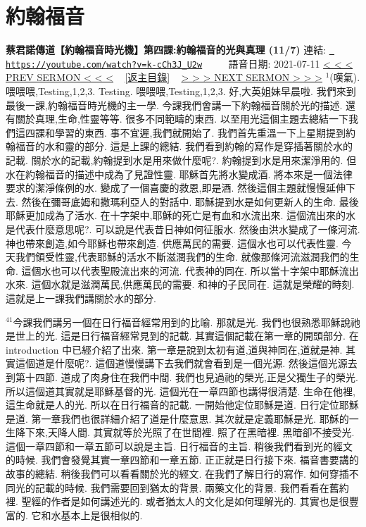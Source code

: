 \documentclass{book}
\begin{document}
\section{約翰福音}
\label{sec:k_cCh3J_U2w}
\textbf{蔡君諾傳道【約翰福音時光機】第四課:約翰福音的光與真理 (11/7)}
\newline
\newline
連結: \href{https://youtube.com/watch?v=k-cCh3J_U2w}{\texttt{ https://youtube.com/watch?v=k-cCh3J\_U2w}} ~~~~ 語音日期: 2021-07-11 
\newline
\newline
\hyperref[sec:dO8lwORzvRQ]{\small{< < < PREV SERMON < < <}}
~
\hyperref[sec:index]{\small{[返主目錄]}}
~
\hyperref[sec:MrgiW6jGDH4]{\small{> > > NEXT SERMON > > >}}
\newline
\newline
$^{1}$(嘆氣).
喂喂喂,Testing,1,2,3.
Testing.
喂喂喂,Testing,1,2,3.
好,大英姐妹早晨啦.
我們來到最後一課,約翰福音時光機的主一學.
今課我們會講一下約翰福音關於光的描述.
還有關於真理,生命,性靈等等.
很多不同範疇的東西.
以至用光這個主題去總結一下我們這四課和學習的東西.
事不宜遲,我們就開始了.
我們首先重溫一下上星期提到約翰福音的水和靈的部分.
這是上課的總結.
我們看到約翰的寫作是穿插著關於水的記載.
關於水的記載,約翰提到水是用來做什麼呢?.
約翰提到水是用來潔淨用的.
但水在約翰福音的描述中成為了見證性靈.
耶穌首先將水變成酒.
將本來是一個法律要求的潔淨條例的水.
變成了一個喜慶的救恩,即是酒.
然後這個主題就慢慢延伸下去.
然後在彌哥底姆和撒瑪利亞人的對話中.
耶穌提到水是如何更新人的生命.
最後耶穌更加成為了活水.
在十字架中,耶穌的死亡是有血和水流出來.
這個流出來的水是代表什麼意思呢?.
可以說是代表昔日神如何征服水.
然後由洪水變成了一條河流.
神也帶來創造,如今耶穌也帶來創造.
供應萬民的需要.
這個水也可以代表性靈.
今天我們領受性靈,代表耶穌的活水不斷滋潤我們的生命.
就像那條河流滋潤我們的生命.
這個水也可以代表聖殿流出來的河流.
代表神的同在.
所以當十字架中耶穌流出水來.
這個水就是滋潤萬民,供應萬民的需要.
和神的子民同在.
這就是榮耀的時刻.
這就是上一課我們講關於水的部分.

$^{41}$今課我們講另一個在日行福音經常用到的比喻.
那就是光.
我們也很熟悉耶穌說祂是世上的光.
這是日行福音經常見到的記載.
其實這個記載在第一章的開頭部分.
在introduction 中已經介紹了出來.
第一章是說到太初有道,道與神同在,道就是神.
其實這個道是什麼呢?.
這個道慢慢講下去我們就會看到是一個光源.
然後這個光源去到第十四節.
道成了肉身住在我們中間.
我們也見過祂的榮光,正是父獨生子的榮光.
所以這個道其實就是耶穌基督的光.
這個光在一章四節也講得很清楚.
生命在他裡,這生命就是人的光.
所以在日行福音的記載.
一開始他定位耶穌是道.
日行定位耶穌是道.
第一章我們也很詳細介紹了道是什麼意思.
其次就是定義耶穌是光.
耶穌的一生降下來,天降人間.
其實就等於光照了在世間裡.
照了在黑暗裡.
黑暗卻不接受光.
這個一章四節和一章五節可以說是主旨.
日行福音的主旨.
稍後我們看到光的經文的時候.
我們會發覺其實一章四節和一章五節.
正正就是日行接下來.
福音書要講的故事的總結.
稍後我們可以看看關於光的經文.
在我們了解日行的寫作.
如何穿插不同光的記載的時候.
我們需要回到猶太的背景.
兩藥文化的背景.
我們看看在舊約裡.
聖經的作者是如何講述光的.
或者猶太人的文化是如何理解光的.
其實也是很豐富的.
它和水基本上是很相似的.
\end{document}
